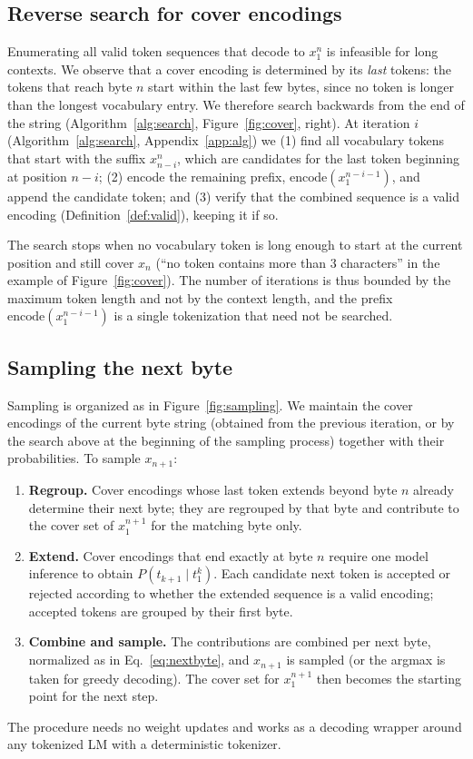 \documentclass{article} %
\newcommand{\enc}{\mathrm{encode}}
\begin{document}
\subsection{Reverse search for cover encodings}
\label{sec:search}
Enumerating all valid token sequences that decode to $x_1^n$ is infeasible for long contexts. We observe that a cover encoding is determined by its \emph{last} tokens: the tokens that reach byte $n$ start within the last few bytes, since no token is longer than the longest vocabulary entry. We therefore search backwards from the end of the string (Algorithm~\ref{alg:search}, Figure~\ref{fig:cover}, right). At iteration $i$ (Algorithm~\ref{alg:search}, Appendix~\ref{app:alg}) we (1) find all vocabulary tokens that start with the suffix $x_{n-i}^{n}$, which are candidates for the last token beginning at position $n-i$; (2) encode the remaining prefix, $\enc(x_1^{n-i-1})$, and append the candidate token; and (3) verify that the combined sequence is a valid encoding (Definition~\ref{def:valid}), keeping it if so.

The search stops when no vocabulary token is long enough to start at the current position and still cover $x_n$ (``no token contains more than 3 characters'' in the example of Figure~\ref{fig:cover}). The number of iterations is thus bounded by the maximum token length and not by the context length, and the prefix $\enc(x_1^{n-i-1})$ is a single tokenization that need not be searched.

\subsection{Sampling the next byte}
\label{sec:sampling}
Sampling is organized as in Figure~\ref{fig:sampling}. We maintain the cover encodings of the current byte string (obtained from the previous iteration, or by the search above at the beginning of the sampling process) together with their probabilities. To sample $x_{n+1}$:
\begin{enumerate}
\item \textbf{Regroup.} Cover encodings whose last token extends beyond byte $n$ already determine their next byte; they are regrouped by that byte and contribute to the cover set of $x_1^{n+1}$ for the matching byte only.
\item \textbf{Extend.} Cover encodings that end exactly at byte $n$ require one model inference to obtain $P(t_{k+1}\mid t_1^k)$. Each candidate next token is accepted or rejected according to whether the extended sequence is a valid encoding; accepted tokens are grouped by their first byte.
\item \textbf{Combine and sample.} The contributions are combined per next byte, normalized as in Eq.~\eqref{eq:nextbyte}, and $x_{n+1}$ is sampled (or the argmax is taken for greedy decoding). The cover set for $x_1^{n+1}$ then becomes the starting point for the next step.
\end{enumerate}
The procedure needs no weight updates and works as a decoding wrapper around any tokenized LM with a deterministic tokenizer.
\end{document}
